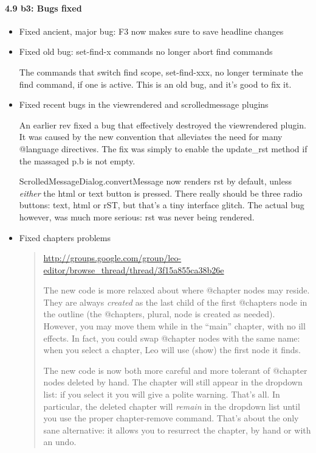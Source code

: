 \documentclass[a4paper,10pt,english]{sphinxmanual}
\begin{document}
\paragraph{4.9 b3: Bugs fixed}
\label{what-is-new:b3-bugs-fixed}\begin{itemize}
\item {} 
Fixed ancient, major bug: F3 now makes sure to save headline changes

\item {} 
Fixed old bug: set-find-x commands no longer abort find commands

The commands that switch find scope, set-find-xxx, no longer terminate the
find command, if one is active.  This is an old bug, and it's good to fix it.

\item {} 
Fixed recent bugs in the viewrendered and scrolledmessage plugins

An earlier rev fixed a bug that effectively destroyed the viewrendered plugin.
It was caused by the new convention that alleviates the need for many
@language directives. The fix was simply to enable the update\_rst method if
the massaged p.b is not empty.

ScrolledMessageDialog.convertMessage now renders rst by default, unless
\emph{either} the html or text button is pressed.  There really should be three
radio buttons: text, html or rST, but that's a tiny interface glitch.  The
actual bug however, was much more serious: rst was never being rendered.

\item {} 
Fixed chapters problems
\begin{quote}

\href{http://groups.google.com/group/leo-editor/browse\_thread/thread/3f15a855ca38b26e}{http://groups.google.com/group/leo-editor/browse\_thread/thread/3f15a855ca38b26e}

The new code is more relaxed about where @chapter nodes may reside.  They
are always \emph{created} as the last child of the first @chapters node in the
outline (the @chapters, plural, node is created as needed).  However, you may
move them while in the ``main'' chapter, with no ill effects.  In fact, you could
swap @chapter nodes with the same name: when you select a chapter, Leo will use
(show) the first node it finds.

The new code is now both more careful and more tolerant of @chapter nodes
deleted by hand.  The chapter will still appear in the dropdown list: if you
select it you will give a polite warning.  That's all.  In particular, the
deleted chapter will \emph{remain} in the dropdown list until you use the proper
chapter-remove command.  That's about the only sane alternative: it allows you
to resurrect the chapter, by hand or with an undo.


\end{quote}
\end{itemize}
\end{document}
